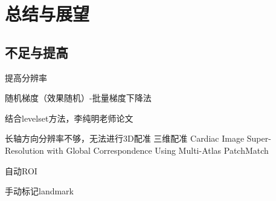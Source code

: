 
\chapter{总结与展望}
\section{不足与提高}

提高分辨率


随机梯度（效果随机）-批量梯度下降法

结合levelset方法，李纯明老师论文

长轴方向分辨率不够，无法进行3D配准
三维配准
Cardiac Image Super-Resolution with Global Correspondence Using Multi-Atlas PatchMatch

自动ROI

手动标记landmark\par
